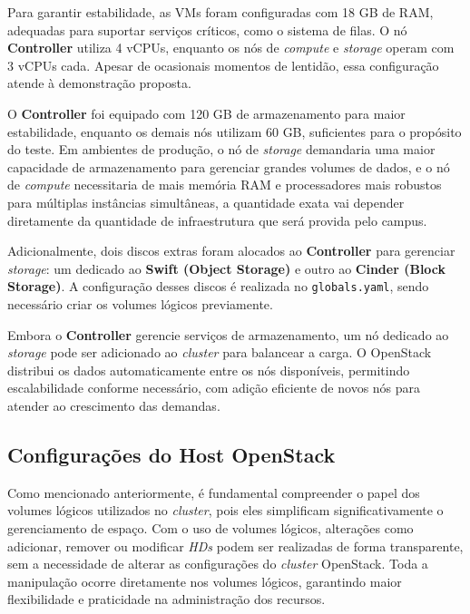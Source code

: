Para garantir estabilidade, as VMs foram configuradas com 18 GB de RAM, adequadas para suportar serviços críticos, como o sistema de filas. O nó \textbf{Controller} utiliza 4 vCPUs, enquanto os nós de \textit{compute} e \textit{storage} operam com 3 vCPUs cada. Apesar de ocasionais momentos de lentidão, essa configuração atende à demonstração proposta.

O \textbf{Controller} foi equipado com 120 GB de armazenamento para maior estabilidade, enquanto os demais nós utilizam 60 GB, suficientes para o propósito do teste. Em ambientes de produção, o nó de \textit{storage} demandaria uma maior capacidade de armazenamento para gerenciar grandes volumes de dados, e o nó de \textit{compute} necessitaria de mais memória RAM e processadores mais robustos para múltiplas instâncias simultâneas, a quantidade exata vai depender diretamente da quantidade de infraestrutura que será provida pelo campus.

Adicionalmente, dois discos extras foram alocados ao \textbf{Controller} para gerenciar \textit{storage}: um dedicado ao \textbf{Swift (Object Storage)} e outro ao \textbf{Cinder (Block Storage)}. A configuração desses discos é realizada no \texttt{globals.yaml}, sendo necessário criar os volumes lógicos previamente.

Embora o \textbf{Controller} gerencie serviços de armazenamento, um nó dedicado ao \textit{storage} pode ser adicionado ao \textit{cluster} para balancear a carga. O OpenStack distribui os dados automaticamente entre os nós disponíveis, permitindo escalabilidade conforme necessário, com adição eficiente de novos nós para atender ao crescimento das demandas.



\subsection{Configurações do Host OpenStack}

Como mencionado anteriormente, é fundamental compreender o papel dos volumes lógicos utilizados no \textit{cluster}, pois eles simplificam significativamente o gerenciamento de espaço. Com o uso de volumes lógicos, alterações como adicionar, remover ou modificar \textit{HDs} podem ser realizadas de forma transparente, sem a necessidade de alterar as configurações do \textit{cluster} OpenStack. Toda a manipulação ocorre diretamente nos volumes lógicos, garantindo maior flexibilidade e praticidade na administração dos recursos.

